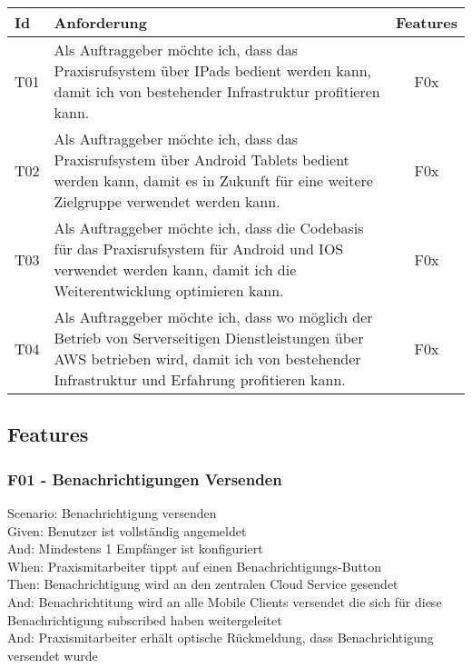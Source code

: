 \begin{table}[h]
    \centering
    \begin{tabular}{|l|p{13cm}|c|}
        \hline
        \textbf{Id} & \textbf{Anforderung}                                                              & \textbf{Features} \\
        \hline
        T01         & Als Auftraggeber möchte ich, dass das Praxisrufsystem über IPads bedient werden kann, damit ich von bestehender Infrastruktur profitieren kann. & F0x \\
        \hline
        T02         & Als Auftraggeber möchte ich, dass das Praxisrufsystem über Android Tablets bedient werden kann, damit es in Zukunft für eine weitere Zielgruppe verwendet werden kann. & F0x \\
        \hline
        T03         & Als Auftraggeber möchte ich, dass die Codebasis für das Praxisrufsystem für Android und IOS verwendet werden kann, damit ich die Weiterentwicklung optimieren kann. & F0x \\
        \hline
        T04         & Als Auftraggeber möchte ich, dass wo möglich der Betrieb von Serverseitigen Dienstleistungen über AWS betrieben wird, damit ich von bestehender Infrastruktur und Erfahrung profitieren kann. & F0x               \\
        \hline
    \end{tabular}\label{tab:userstories3}
\end{table}

\clearpage

\subsection{Features}\label{subsec:features}

    \subsubsection*{F01 - Benachrichtigungen Versenden}

        Scenario: Benachrichtigung versenden\\
        Given:  Benutzer ist vollständig angemeldet\\
        And:    Mindestens 1 Empfänger ist konfiguriert\\
        When:   Praxismitarbeiter tippt auf einen Benachrichtigungs-Button\\
        Then:   Benachrichtigung wird an den zentralen Cloud Service gesendet\\
        And:    Benachrichtitung wird an alle Mobile Clients versendet die sich für diese Benachrichtigung subscribed haben weitergeleitet\\
        And:    Praxismitarbeiter erhält optische Rückmeldung, dass Benachrichtigung versendet wurde\\


